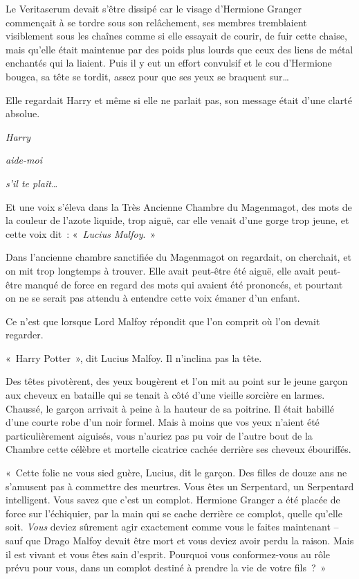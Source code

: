 Le Veritaserum devait s'être dissipé car le visage d'Hermione Granger commençait à se tordre sous son relâchement, ses membres tremblaient visiblement sous les chaînes comme si elle essayait de courir, de fuir cette chaise, mais qu'elle était maintenue par des poids plus lourds que ceux des liens de métal enchantés qui la liaient. Puis il y eut un effort convulsif et le cou d'Hermione bougea, sa tête se tordit, assez pour que ses yeux se braquent sur…

Elle regardait Harry et même si elle ne parlait pas, son message était d'une clarté absolue.

\emph{Harry}

\emph{aide-moi}

\emph{s'il te plaît…}

Et une voix s'éleva dans la Très Ancienne Chambre du Magenmagot, des mots de la couleur de l'azote liquide, trop aiguë, car elle venait d'une gorge trop jeune, et cette voix dit~: «~\emph{Lucius Malfoy}.~»

\later

Dans l'ancienne chambre sanctifiée du Magenmagot on regardait, on cherchait, et on mit trop longtemps à trouver. Elle avait peut-être été aiguë, elle avait peut-être manqué de force en regard des mots qui avaient été prononcés, et pourtant on ne se serait pas attendu à entendre cette voix émaner d'un enfant.

Ce n'est que lorsque Lord Malfoy répondit que l'on comprit où l'on devait regarder.

«~Harry Potter~», dit Lucius Malfoy. Il n'inclina pas la tête.

Des têtes pivotèrent, des yeux bougèrent et l'on mit au point sur le jeune garçon aux cheveux en bataille qui se tenait à côté d'une vieille sorcière en larmes. Chaussé, le garçon arrivait à peine à la hauteur de sa poitrine. Il était habillé d'une courte robe d'un noir formel. Mais à moins que vos yeux n'aient été particulièrement aiguisés, vous n'auriez pas pu voir de l'autre bout de la Chambre cette célèbre et mortelle cicatrice cachée derrière ses cheveux ébouriffés.

«~Cette folie ne vous sied guère, Lucius, dit le garçon. Des filles de douze ans ne s'amusent pas à commettre des meurtres. Vous êtes un Serpentard, un Serpentard intelligent. Vous savez que c'est un complot. Hermione Granger a été placée de force sur l'échiquier, par la main qui se cache derrière ce complot, quelle qu'elle soit. \emph{Vous} deviez sûrement agir exactement comme vous le faites maintenant -- sauf que Drago Malfoy devait être mort et vous deviez avoir perdu la raison. Mais il est vivant et vous êtes sain d'esprit. Pourquoi vous conformez-vous au rôle prévu pour vous, dans un complot destiné à prendre la vie de votre fils~?~»

